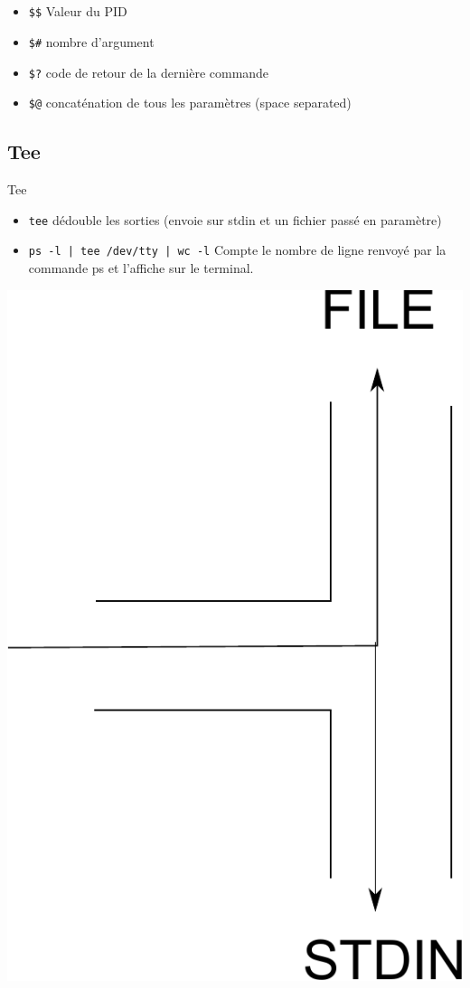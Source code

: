 \subsection{\subsectitle}
\begin{frame}[containsverbatim]{\sectitle}
\begin{block}{\subsectitle}
\begin{itemize}
\item \verb!$$! Valeur du PID
\item \verb!$#! nombre d'argument 
\item \verb!$?! code de retour de la dernière commande
\item \verb!$@! concaténation de tous les paramètres (space separated)   %

\end{itemize}
\end{block}
\end{frame}


\def\subsectitle{Tee}
\subsection{\subsectitle}
\begin{frame}[containsverbatim]{\sectitle}
\begin{block}{\subsectitle}
\begin{itemize}
\item \verb!tee! dédouble les sorties (envoie sur stdin et un fichier passé en paramètre)
\item \verb!ps -l | tee /dev/tty | wc -l! Compte le nombre de ligne renvoyé par la commande ps et l'affiche sur le terminal.
\end{itemize}
\end{block}

\includegraphics[width=.3\textwidth]{images/tee.pdf}
\end{frame}


